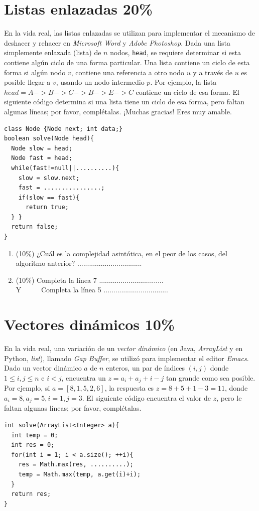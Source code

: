 \documentclass[10 pt]{article}
\begin{document}
\begin{multicols}{2}
\section{Listas enlazadas 20\%}
En la vida real, las listas enlazadas se utilizan para implementar el mecanismo de deshacer y rehacer en \textit{Microsoft Word} y \textit{Adobe Photoshop}. Dada una lista simplemente enlazada (lista) de $n$ nodos, \texttt{head}, se requiere determinar si esta contiene algún ciclo de una forma particular. Una lista contiene un ciclo de esta forma si algún nodo $v$, contiene una referencia a otro nodo $u$ y a través de $u$ es posible llegar a $v$, usando  un nodo intermedio $p$. Por ejemplo, la lista $head = A->B->C->B->E->C$ contiene un ciclo de esa forma. El siguiente código determina si una lista tiene un ciclo de esa forma, pero faltan algunas líneas; por favor, complétalas. ¡Muchas gracias! Eres muy amable.
{\small
\begin{lstlisting}
class Node {Node next; int data;}
boolean solve(Node head){
  Node slow = head;
  Node fast = head;
  while(fast!=null||..........){
    slow = slow.next;
    fast = ................;
    if(slow == fast){
      return true;
  } }
  return false;
}
\end{lstlisting}
}
\begin{enumerate}[label=\Alph*]
	\item (10\%) ¿Cuál es la complejidad asintótica, en el peor de los casos, del algoritmo anterior?
	.................................
	\item (10\%) Completa la línea 7 .................................\\
	Y \ \ \ \ \ Completa la línea 5 .................................
\end{enumerate}

\section{Vectores dinámicos 10\%}
En la vida real, una variación de un \textit{vector dinámico} (en Java, \textit{ArrayList} y en Python, \textit{list}), llamado \textit{Gap Buffer}, se utilizó para implementar el editor \textit{Emacs}. 
Dado un vector dinámico $a$ de $n$ enteros, un par de índices $(i, j)$ donde $1 \leq i, j \leq n$ e $i < j$, encuentra un $z = a_i + a_j + i - j$ tan grande como sea posible. Por ejemplo, si $a = [8, 1, 5, 2, 6]$, la respuesta es $z = 8 + 5 + 1 - 3 = 11$, donde $a_i = 8, a_j = 5, i = 1, j =3$. El siguiente código encuentra el valor de $z$, pero le faltan algunas líneas; 
por favor, complétalas. 
\begin{lstlisting}
int solve(ArrayList<Integer> a){
  int temp = 0;
  int res = 0;
  for(int i = 1; i < a.size(); ++i){
    res = Math.max(res, ..........);
    temp = Math.max(temp, a.get(i)+i);
  }
  return res;
}


\end{lstlisting}
\end{multicols}
\end{document}
